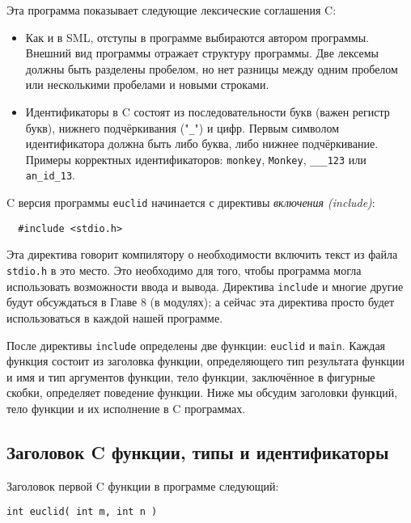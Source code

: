 Эта программа показывает следующие лексические соглашения C:

\begin{itemize}
\item{Как и в SML, отступы в программе выбираются автором программы. Внешний вид программы отражает структуру программы. Две лексемы должны быть разделены пробелом, но нет разницы между одним пробелом или несколькими пробелами и новыми строками.}

\item{\label{CIdentifiers}Идентификаторы в C состоят из последовательности букв (важен регистр букв), нижнего подчёркивания ("\lstinline|_|") и цифр. Первым символом идентификатора должна быть либо буква, либо нижнее подчёркивание. Примеры корректных идентификаторов: \lstinline|monkey|, \lstinline|Monkey|, \lstinline|___123| или \lstinline|an_id_13|.}
\end{itemize}

C версия программы \lstinline|euclid| начинается с директивы \emph{включения (include)}:

\begin{lstlisting}
  #include <stdio.h>
\end{lstlisting}

Эта директива говорит компилятору о необходимости включить текст из файла \lstinline|stdio.h| в это место. Это необходимо для того, чтобы программа могла использовать возможности ввода и вывода. Директива \lstinline|include| и многие другие будут обсуждаться в Главе 8 (в модулях); а сейчас эта директива просто будет использоваться в каждой нашей программе.

После директивы \lstinline|include| определены две функции: \lstinline|euclid| и \lstinline|main|. Каждая функция состоит из заголовка функции, определяющего тип результата функции и имя и тип аргументов функции, тело функции, заключённое в фигурные скобки, определяет поведение функции. Ниже мы обсудим заголовки функций, тело функции и их исполнение в C программах.

\subsection{Заголовок C функции, типы и идентификаторы}\label{HeaderCFunction}

Заголовок первой C функции в программе следующий:

\begin{lstlisting}
int euclid( int m, int n )
\end{lstlisting}

